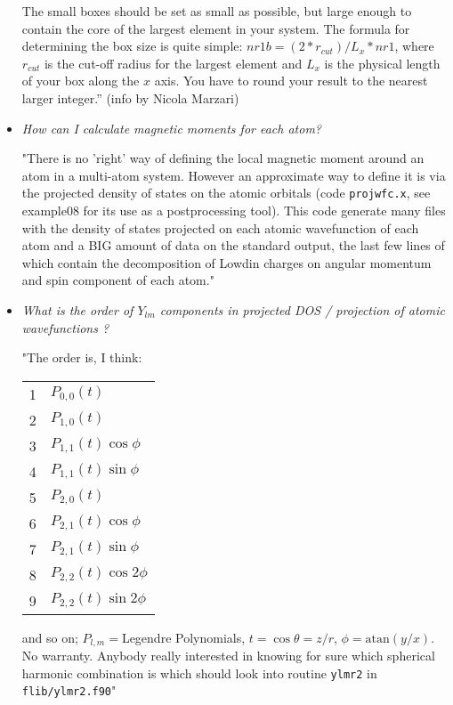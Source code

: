 \documentclass[12pt,a4paper]{article}
\begin{document}
\begin{itemize}
The small boxes should be set as small as possible, but large enough to 
contain the core of the largest element in your system. The formula for 
determining the box size is quite simple:
$nr1b=(2*r_{cut})/L_x*nr1$,
where $r_{cut}$ is the cut-off radius for the largest element and $L_x$ 
is the physical length of your box along the $x$ axis. You have to round 
your result to the nearest larger integer.'' (info by Nicola Marzari)

\item {\em How can I calculate magnetic moments for each atom?}

"There is no 'right' way of defining the local magnetic moment around
 an atom in a multi-atom system. However an approximate way to define
 it is via the projected density of states on the atomic orbitals (code 
 {\tt projwfc.x}, see example08 for its use as a postprocessing tool). 
 This code generate many files with the density of states projected 
 on each atomic wavefunction of each atom and a BIG amount of data 
 on the standard output, the last few lines of which contain the 
 decomposition of Lowdin charges on angular momentum and spin component 
 of each atom."

\item {\em What is the order of $Y_{lm}$ components in projected DOS /
projection of atomic wavefunctions ?}

"The order is, I think:

\begin{tabular}{rl}
1& $P_{0,0}(t)$           \\
2& $P_{1,0}(t)$           \\
3& $P_{1,1}(t) \cos\phi$ \\
4& $P_{1,1}(t) \sin\phi$ \\
5& $P_{2,0}(t)$           \\
6& $P_{2,1}(t) \cos\phi$ \\
7& $P_{2,1}(t) \sin\phi$ \\
8& $P_{2,2}(t) \cos 2\phi$\\
9& $P_{2,2}(t) \sin 2\phi$\\
\end{tabular}

and so on; $P_{l,m}=$Legendre Polynomials, $t=\cos\theta=z/r$, $\phi=\mbox{atan}(y/x)$.
No warranty. Anybody really interested in knowing for sure which
spherical harmonic combination is which should look into routine
\texttt{ylmr2} in \texttt{flib/ylmr2.f90}"
\end{itemize}
\end{document}
